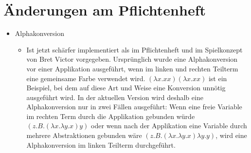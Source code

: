 \section{Änderungen am Pflichtenheft}

\begin{itemize}
\item Alphakonversion
\begin{itemize} 
\item Ist jetzt schärfer implementiert als im Pflichtenheft und im Spielkonzept von Bret Victor vorgegeben. Ursprünglich wurde eine Alphakonversion vor einer Applikation ausgeführt, wenn im linken und rechten Teilterm eine gemeinsame Farbe verwendet wird. $(\lambda x.xx)(\lambda x.xx)$ ist ein Beispiel, bei dem auf diese Art und Weise eine Konversion unnötig ausgeführt wird. In der aktuellen Version wird deshalb eine Alphakonversion nur in zwei Fällen ausgeführt: Wenn eine freie Variable im rechten Term durch die Applikation gebunden würde $(z.B. (\lambda x. \lambda y.x) y)$ oder wenn nach der Applikation eine Variable durch mehrere Abstraktionen gebunden wäre $(z.B. (\lambda x. \lambda y.x) \lambda y.y)$, wird eine Alphakonversion im linken Teilterm durchgeführt.
	\end{itemize}
\end{itemize}
